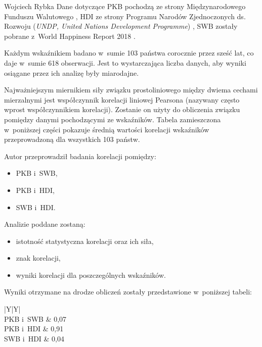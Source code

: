 \begin{artplenv}{Wojciech Rybka}
Dane dotyczące PKB pochodzą ze strony Międzynarodowego Funduszu Walutowego
\parencite{international_monetary_fund_world_2019a},
HDI ze strony Programu Narodów Zjednoczonych ds. Rozwoju (\textit{UNDP, United Nations
Development Programme})
\parencite{united_nations_development_programme_human_2019},
SWB zostały
pobrane z~World Happiness Report 2018
\parencite{noauthor_world_2018}.

Każdym wskaźnikiem badano w~sumie 103 państwa corocznie przez sześć lat, co daje w~sumie 618 obserwacji. Jest to
wystarczająca liczba danych, aby wyniki osiągane przez ich analizę były miarodajne. 

Najważniejszym miernikiem siły związku prostoliniowego między dwiema cechami mierzalnymi jest współczynnik korelacji
liniowej Pearsona (nazywany często wprost współczynnikiem korelacji). Zostanie on użyty do obliczenia związku pomiędzy
danymi pochodzącymi ze wskaźników. Tabela zamieszczona w~poniższej części pokazuje średnią wartości korelacji
wskaźników przeprowadzoną dla wszystkich 103 państw.

Autor przeprowadził badania korelacji pomiędzy:

\begin{itemize}
\item PKB i~SWB,
\item PKB i~HDI,
\item SWB i~HDI.
\end{itemize}
Analizie poddane zostaną:

\begin{itemize}
\item istotność statystyczna korelacji oraz ich siła,
\item znak korelacji,
\item wyniki korelacji dla poszczególnych wskaźników.
\end{itemize}
Wyniki otrzymane na drodze obliczeń zostały przedstawione w~poniższej tabeli:


\captionsetup[table]{name=Tabela}
\begin{table}[H]
	\begin{tabularx}{\textwidth}{|Y|Y|}
		\hline
		\\\hline
		PKB i~SWB &
		0,07\\\hline
		PKB i~HDI &
		0,91\\\hline
		SWB i~HDI &
		0,04\\\hline
	\end{tabularx}
	

\end{table}
\end{artplenv}
